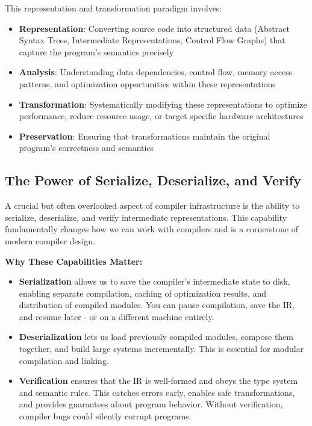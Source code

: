 \documentclass[11pt,a4paper]{article}
\begin{document}
This representation and transformation paradigm involves:
\begin{itemize}
    \item \textbf{Representation}: Converting source code into structured data (Abstract Syntax Trees, Intermediate Representations, Control Flow Graphs) that capture the program's semantics precisely
    \item \textbf{Analysis}: Understanding data dependencies, control flow, memory access patterns, and optimization opportunities within these representations
    \item \textbf{Transformation}: Systematically modifying these representations to optimize performance, reduce resource usage, or target specific hardware architectures
    \item \textbf{Preservation}: Ensuring that transformations maintain the original program's correctness and semantics
\end{itemize}

\subsection{The Power of Serialize, Deserialize, and Verify}

A crucial but often overlooked aspect of compiler infrastructure is the ability to serialize, deserialize, and verify intermediate representations. This capability fundamentally changes how we can work with compilers and is a cornerstone of modern compiler design.

\textbf{Why These Capabilities Matter:}
\begin{itemize}
    \item \textbf{Serialization} allows us to save the compiler's intermediate state to disk, enabling separate compilation, caching of optimization results, and distribution of compiled modules. You can pause compilation, save the IR, and resume later - or on a different machine entirely.
    \item \textbf{Deserialization} lets us load previously compiled modules, compose them together, and build large systems incrementally. This is essential for modular compilation and linking.
    \item \textbf{Verification} ensures that the IR is well-formed and obeys the type system and semantic rules. This catches errors early, enables safe transformations, and provides guarantees about program behavior. Without verification, compiler bugs could silently corrupt programs.
\end{itemize}
\end{document}
